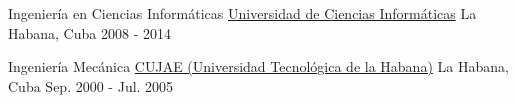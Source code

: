 
\begin{cventries}

  \cventry
    {Ingeniería en Ciencias Informáticas} %
    {\faUniversity \hphantom{-} \href{https://www.uci.cu/}{Universidad de Ciencias Informáticas}} %
    {La Habana, Cuba} %
    {2008 - 2014} %
    {
      \begin{cvitems} %
      \end{cvitems}
    }

  \cventry
    {Ingeniería Mecánica} %
    {\faUniversity \hphantom{-} \href{http://cujae.edu.cu/}{CUJAE (Universidad Tecnológica de la Habana)}} %
    {La Habana, Cuba} %
    {Sep. 2000 - Jul. 2005} %
    {
      \begin{cvitems} %
      \end{cvitems}
    }

\end{cventries}

